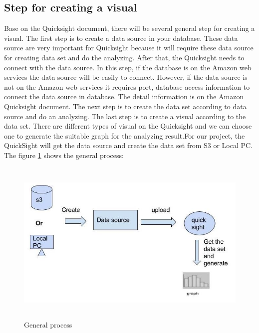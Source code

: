     \subsection{Step for creating a visual}
    Base on the Quicksight document, there will be several general step for creating a visual. The first step is to create a data source in your database. These data source are very important for Quicksight because it will require these data source for creating data set and do the analyzing. After that, the Quicksight needs to connect with the data source. In this step, if the database is on the Amazon web services the data source will be easily to connect. However, if the data source is not on the Amazon web services it requires port, database access information to connect the data source in database. The detail information is on the Amazon Quicksight document. The next step is to create the data set according to data source and do an analyzing. The last step is to create a visual according to the data set. There are different types of visual on the Quicksight and we can choose one to generate the suitable graph for the analyzing result.\cite{w2}For our project, the QuickSight will get the data source and create the data set from S3 or Local PC.\\
    The figure \ref{fig:2} shows the general process:
    \begin{figure}[H]
    \includegraphics[width=16cm, height=8cm]{6.jpg}
    \centering
    \caption{\label{fig:2}General process}
    \end{figure}

